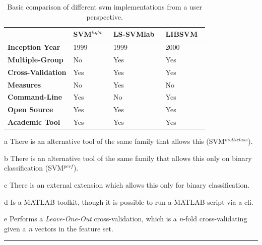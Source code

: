 \begin{table}[t!]
    \centering
    \begin{threeparttable}
      \begin{tabular}{|l|l|l|l|}
        \rowcolor[RGB]{169,196,223}
        \hline & \textbf{SVM$^{light}$~\cite{Joa99}} & \textbf{LS-SVMlab~\cite{SV99, PSV+02}} & \textbf{LIBSVM~\cite{CL11}}  \\
        \hline \cellcolor[RGB]{169,196,223} \textbf{Inception Year} & 1999 & 1999 & 2000  \\
        \hline \cellcolor[RGB]{169,196,223} \textbf{Multiple-Group} & No\tnote{a} & Yes & Yes \\
        \hline \cellcolor[RGB]{169,196,223} \textbf{Cross-Validation} & Yes\tnote{e} & Yes & Yes \\
        \hline \cellcolor[RGB]{169,196,223} \textbf{Measures} & No\tnote{b} & Yes & No\tnote{c} \\
        \hline \cellcolor[RGB]{169,196,223} \textbf{Command-Line} & Yes & No\tnote{d} & Yes\tnote{f} \\
        \hline \cellcolor[RGB]{169,196,223} \textbf{Open Source} & Yes & Yes & Yes \\
        \hline \cellcolor[RGB]{169,196,223} \textbf{Academic Tool} & Yes & Yes & Yes \\
        \hline
      \end{tabular}
      \begin{tablenotes}
        \item[a] There is an alternative tool of the same family that allows this (SVM$^{multiclass}$).
        \item[b] There is an alternative tool of the same family that allows this only on binary classification (SVM$^{perf}$).
        \item[c] There is an external extension which allows this only for binary classification.
        \item[d] Is a MATLAB toolkit, though it is possible to run a MATLAB script via a \gls{cli}.
        \item[e] Performs a \emph{Leave-One-Out} cross-validation, which is a \emph{n}-fold cross-validating given a \emph{n} vectors in the feature set.
      \end{tablenotes}
    \end{threeparttable}
    \caption{Basic comparison of different \gls{svm} implementations from a user perspective.}
    \vspace{2mm}
    \hrule
    \label{tab:svm_tools}
  \end{table}

